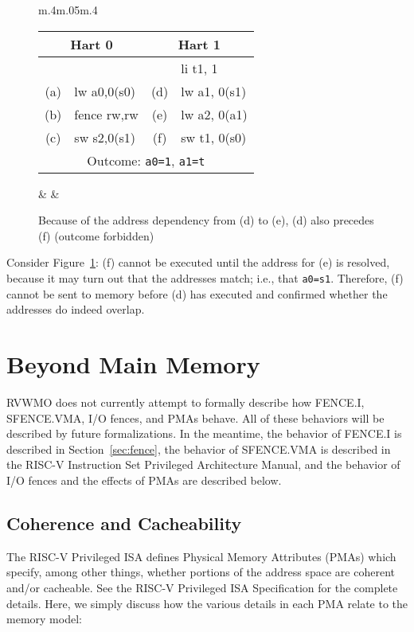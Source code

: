 \begin{figure}[h!]
  \centering
  \begin{tabular}{m{.4\linewidth}m{.05\linewidth}m{.4\linewidth}}
    \tt\small
    \begin{tabular}{cl||cl}
    \multicolumn{2}{c}{Hart 0} & \multicolumn{2}{c}{Hart 1} \\
    \hline
        &             &     & li t1, 1       \\
    (a) & lw a0,0(s0) & (d) & lw a1, 0(s1)   \\
    (b) & fence rw,rw & (e) & lw a2, 0(a1)   \\
    (c) & sw s2,0(s1) & (f) & sw t1, 0(s0)   \\
    \hline
    \multicolumn{4}{c}{Outcome: {\tt a0=1}, {\tt a1=t}}
    \end{tabular}  
    & &
    
  \end{tabular}
  \caption{Because of the address dependency from (d) to (e), (d) also precedes (f) (outcome forbidden)}
  \label{fig:litmus:addrpo}
\end{figure}

Consider Figure~\ref{fig:litmus:addrpo}:
(f) cannot be executed until the address for (e) is resolved, because it may turn out that the addresses match; i.e., that {\tt a0=s1}.  Therefore, (f) cannot be sent to memory before (d) has executed and confirmed whether the addresses do indeed overlap.


\section{Beyond Main Memory}

RVWMO does not currently attempt to formally describe how FENCE.I, SFENCE.VMA, I/O fences, and PMAs behave.
All of these behaviors will be described by future formalizations.
In the meantime, the behavior of FENCE.I is described in Section~\ref{sec:fence}, the behavior of SFENCE.VMA is described in the RISC-V Instruction Set Privileged Architecture Manual, and the behavior of I/O fences and the effects of PMAs are described below.

\subsection{Coherence and Cacheability}

The RISC-V Privileged ISA defines Physical Memory Attributes (PMAs) which specify, among other things, whether portions of the address space are coherent and/or cacheable.
See the RISC-V Privileged ISA Specification for the complete details.
Here, we simply discuss how the various details in each PMA relate to the memory model:

